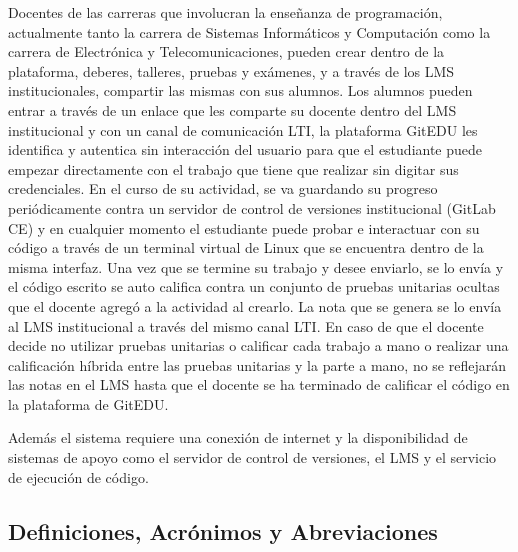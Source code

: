 Docentes de las carreras que involucran la enseñanza de programación, actualmente tanto la carrera de Sistemas Informáticos y Computación como la carrera de Electrónica y Telecomunicaciones, pueden crear dentro de la plataforma, deberes, talleres, pruebas y exámenes, y a través de los LMS institucionales, compartir las mismas con sus alumnos. Los alumnos pueden entrar a través de un enlace que les comparte su docente dentro del LMS institucional y con un canal de comunicación LTI, la plataforma GitEDU les identifica y autentica sin interacción del usuario para que el estudiante puede empezar directamente con el trabajo que tiene que realizar sin digitar sus credenciales. En el curso de su actividad, se va guardando su progreso periódicamente contra un servidor de control de versiones institucional (GitLab CE) y en cualquier momento el estudiante puede probar e interactuar con su código a través de un terminal virtual de Linux que se encuentra dentro de la misma interfaz. Una vez que se termine su trabajo y desee enviarlo, se lo envía y el código escrito se auto califica contra un conjunto de pruebas unitarias ocultas que el docente agregó a la actividad al crearlo. La nota que se genera se lo envía al LMS institucional a través del mismo canal LTI. En caso de que el docente decide no utilizar pruebas unitarias o calificar cada trabajo a mano o realizar una calificación híbrida entre las pruebas unitarias y la parte a mano, no se reflejarán las notas en el LMS hasta que el docente se ha terminado de calificar el código en la plataforma de GitEDU.

Además el sistema requiere una conexión de internet y la disponibilidad de sistemas de apoyo como el servidor de control de versiones, el LMS y el servicio de ejecución de código.

\subsection{Definiciones, Acrónimos y Abreviaciones}


